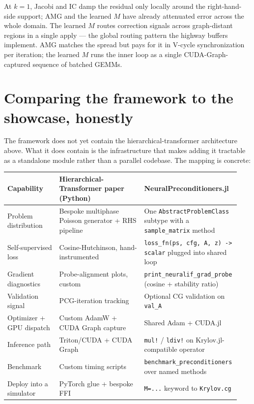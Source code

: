 \documentclass[11pt]{article}
\newcommand{\code}[1]{\texttt{\small #1}}
\begin{document}
At $k=1$, Jacobi and IC damp the residual only locally around the right-hand-side support; AMG and the learned $M$ have already attenuated error across the whole domain. The learned $M$ routes correction signals across graph-distant regions in a single apply --- the global routing pattern the highway buffers implement. AMG matches the spread but pays for it in V-cycle synchronization per iteration; the learned $M$ runs the inner loop as a single CUDA-Graph-captured sequence of batched GEMMs.

\section{Comparing the framework to the showcase, honestly}

The framework does not yet contain the hierarchical-transformer architecture above. What it does contain is the infrastructure that makes adding it tractable as a standalone module rather than a parallel codebase. The mapping is concrete:

\begin{center}
\small
\begin{tabular}{@{}p{0.22\linewidth} p{0.36\linewidth} p{0.36\linewidth}@{}}
\toprule
Capability & Hierarchical-Transformer paper (Python) & NeuralPreconditioners.jl \\
\midrule
Problem distribution     & Bespoke multiphase Poisson generator + RHS pipeline & One \code{AbstractProblemClass} subtype with a \code{sample\_matrix} method \\
Self-supervised loss     & Cosine-Hutchinson, hand-instrumented & \code{loss\_fn(ps, cfg, A, z) -> scalar} plugged into shared loop \\
Gradient diagnostics     & Probe-alignment plots, custom & \code{print\_neuralif\_grad\_probe} (cosine + stability ratio) \\
Validation signal        & PCG-iteration tracking & Optional CG validation on \code{val\_A} \\
Optimizer + GPU dispatch & Custom AdamW + CUDA Graph capture & Shared Adam + CUDA.jl \\
Inference path           & Triton/CUDA + CUDA Graph & \code{mul!} / \code{ldiv!} on Krylov.jl-compatible operator \\
Benchmark                & Custom timing scripts & \code{benchmark\_preconditioners} over named methods \\
Deploy into a simulator  & PyTorch glue + bespoke FFI & \code{M=...} keyword to \code{Krylov.cg} \\
\bottomrule
\end{tabular}
\end{center}
\end{document}
